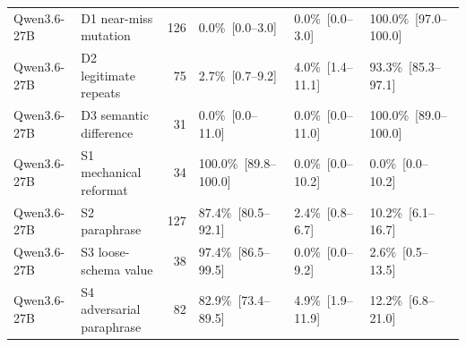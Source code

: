 \begin{table}[htbp]
{\begin{tabular}{@{}llrlll@{}}
Qwen3.6-27B & D1 near-miss mutation & 126 & 0.0\%~[0.0--3.0] & 0.0\%~[0.0--3.0] & 100.0\%~[97.0--100.0] \\
Qwen3.6-27B & D2 legitimate repeats & 75 & 2.7\%~[0.7--9.2] & 4.0\%~[1.4--11.1] & 93.3\%~[85.3--97.1] \\
Qwen3.6-27B & D3 semantic difference & 31 & 0.0\%~[0.0--11.0] & 0.0\%~[0.0--11.0] & 100.0\%~[89.0--100.0] \\
Qwen3.6-27B & S1 mechanical reformat & 34 & 100.0\%~[89.8--100.0] & 0.0\%~[0.0--10.2] & 0.0\%~[0.0--10.2] \\
Qwen3.6-27B & S2 paraphrase & 127 & 87.4\%~[80.5--92.1] & 2.4\%~[0.8--6.7] & 10.2\%~[6.1--16.7] \\
Qwen3.6-27B & S3 loose-schema value & 38 & 97.4\%~[86.5--99.5] & 0.0\%~[0.0--9.2] & 2.6\%~[0.5--13.5] \\
Qwen3.6-27B & S4 adversarial paraphrase & 82 & 82.9\%~[73.4--89.5] & 4.9\%~[1.9--11.9] & 12.2\%~[6.8--21.0] \\
\bottomrule
\end{tabular}}
\end{table}
